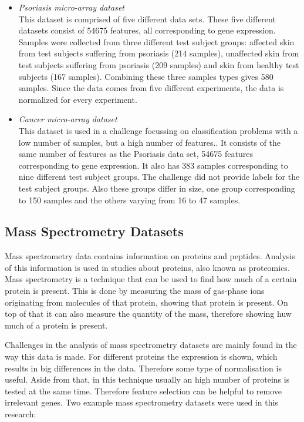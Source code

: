 \documentclass[10pt,a4paper]{report}
\begin{document}
	\begin{itemize}
		\item \textit{Psoriasis micro-array dataset} \\ This dataset is comprised of five different data sets\cite{nair2009genome, suarez2012expanding, bigler2013cross, yao2008type}. These five different datasets consist of 54675 features, all corresponding to gene expression. Samples were collected from three different test subject groups: affected skin from test subjects suffering from psoriasis (214 samples), unaffected skin from test subjects suffering from psoriasis (209 samples) and skin from healthy test subjects (167 samples). Combining these three samples types gives 580 samples. Since the data comes from five different experiments, the data is normalized for every experiment.
		\item \textit{Cancer micro-array dataset} \\ This dataset is used in a challenge focussing on classification problems with a low number of samples, but a high number of features.\cite{wojnarski2010rsctc}. It consists of the same number of features as the Psoriasis data set, 54675 features corresponding to gene expression. It also has 383 samples corresponding to nine different test subject groups. The challenge did not provide labels for the test subject groups. Also these groups differ in size, one group corresponding to 150 samples and the others varying from 16 to 47 samples.
	\end{itemize}
	
	\subsection{Mass Spectrometry Datasets}
	\label{PLsubsec:MassSpect}
	
	Mass spectrometry data contains information on proteins and peptides\cite{cottrell1999probability, dettmer2007mass}. Analysis of this information is used in studies about proteins, also known as proteomics\cite{matthiesen2008analysis}. Mass spectrometry is a technique that can be used to find how much of a certain protein is present. This is done by measuring the mass of gas-phase ions originating from molecules of that protein, showing that protein is present. On top of that it can also measure the quantity of the mass, therefore showing huw much of a protein is present\cite{watson2007introduction}.
	
	
	Challenges in the analysis of mass spectrometry datasets are mainly found in the way this data is made. For different proteins the expression is shown, which results in big differences in the data. Therefore some type of normalisation is useful. Aside from that, in this technique usually an high number of proteins is tested at the same time. Therefore feature selection can be helpful to remove irrelevant genes. Two example mass spectrometry datasets were used in this research:
\end{document}
